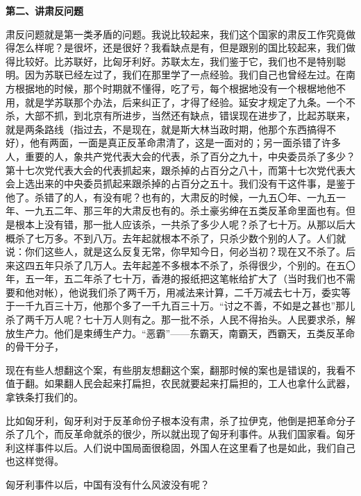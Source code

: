 \textbf{第二、讲肃反问题}

肃反问题就是第一类矛盾的问题。我说比较起来，我们这个国家的肃反工作究竟做得怎么样呢？是很坏，还是很好？我看缺点是有，但是跟别的国比较起来，我们做得比较好。比苏联好，比匈牙利好。苏联太左，我们鉴于它，我们也不是特别聪明。因为苏联已经左过了，我们在那里学了一点经验。我们自己也曾经左过。在南方根据地的时候，那个时期就不懂得，吃了亏，每个根据地没有一个根椐地他不用，就是学苏联那个办法，后来纠正了，才得了经验。延安才规定了九条。一个不杀，大部不抓，到北京有所进步，当然还有缺点，错误现在进步了，比起苏联来，就是两条路线（指过去，不是现在，就是斯大林当政时期，他那个东西搞得不好），他有两面，一面是真正反革命肃清了，这是一面对的；另一面杀错了许多人，重要的人，象共产党代表大会的代表，杀了百分之九十，中央委员杀了多少？第十七次党代表大会的代表抓起来，跟杀掉的占百分之八十，而第十七次党代表大会上选出来的中央委员抓起来跟杀掉的占百分之五十。我们没有干这件事，是鉴于他了。杀错了的人，有没有呢？也有的，大肃反的时候，一九五〇年、一九五一年、一九五二年、那三年的大肃反也有的。杀土豪劣绅在五类反革命里面也有。但是根本上没有错，那一批人应该杀，一共杀了多少人呢？杀了七十万。从那以后大概杀了七万多。不到八万。去年起就根本不杀了，只杀少数个别的人了。人们就说：你们这些人，就是这么反复无常，你早知今日，何必当初？现在又不杀了。后来这四五年只杀了几万人。去年起差不多根本不杀了，杀得很少，个别的。在五〇年，五一年，五二年杀了七十万，香港的报纸把这笔帐给扩大了（当时我们也不需要和他对帐），他说我们杀了两千万，用减法来计算，二千万减去七十万，委实等于一千九百三十万，他那个多了一千九百三十万。“讨之不善，不如是之甚也”那儿杀了两千万人呢？七十万人则有之。那一批不杀，人民不得抬头。人民要求杀，解放生产力。他们是束缚生产力。“恶霸”——东霸天，南霸天，西霸天，五类反革命的骨干分子，

现在有些人想翻这个案，有些朋友想翻这个案，翻那时候的案也是错误的，我看不值于翻。如果翻人民会起来打扁担，农民就要起来打扁担的，工人也拿什么武器，拿铁条打我们的。

比如匈牙利，匈牙利对于反革命份子根本没有肃，杀了拉伊克，他倒是把革命分子杀了几个，而反革命就杀的很少，所以就出现了匈牙利事件。从我们国家看。匈牙利这样事件以后。人们说中国局面很稳固，外国人在这里看了也是如此，我们自己也这样觉得。

匈牙利事件以后，中国有没有什么风波没有呢？

